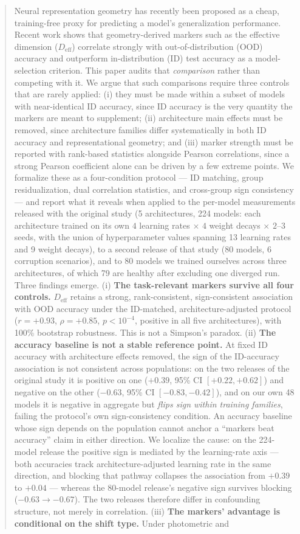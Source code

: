 \documentclass[10pt]{article} %
\begin{document}
\begin{abstract}
Neural representation geometry has recently been proposed as a cheap, training-free proxy for predicting a model's generalization performance. Recent work \citep{chou2026diagnosing} shows that geometry-derived markers such as the effective dimension ($D_{\mathrm{eff}}$) correlate strongly with out-of-distribution (OOD) accuracy and outperform in-distribution (ID) test accuracy as a model-selection criterion. This paper audits that \emph{comparison} rather than competing with it. We argue that such comparisons require three controls that are rarely applied: (i) they must be made within a subset of models with near-identical ID accuracy, since ID accuracy is the very quantity the markers are meant to supplement; (ii) architecture main effects must be removed, since architecture families differ systematically in both ID accuracy and representational geometry; and (iii) marker strength must be reported with rank-based statistics alongside Pearson correlations, since a strong Pearson coefficient alone can be driven by a few extreme points. We formalize these as a four-condition protocol --- ID matching, group residualization, dual correlation statistics, and cross-group sign consistency --- and report what it reveals when applied to the per-model measurements released with the original study (5 architectures, 224 models: each architecture trained on its own $4$ learning rates $\times$ $4$ weight decays $\times$ $2$--$3$ seeds, with the union of hyperparameter values spanning 13 learning rates and 9 weight decays), to a second release of that study (80 models, 6 corruption scenarios), and to 80 models we trained ourselves across three architectures, of which 79 are healthy after excluding one diverged run. Three findings emerge. (i) \textbf{The task-relevant markers survive all four controls.} $D_{\mathrm{eff}}$ retains a strong, rank-consistent, sign-consistent association with OOD accuracy under the ID-matched, architecture-adjusted protocol ($r = +0.93$, $\rho = +0.85$, $p < 10^{-4}$, positive in all five architectures), with 100\% bootstrap robustness. This is not a Simpson's paradox. (ii) \textbf{The accuracy baseline is not a stable reference point.} At fixed ID accuracy with architecture effects removed, the sign of the ID-accuracy association is not consistent across populations: on the two releases of the original study it is positive on one ($+0.39$, 95\% CI $[+0.22,+0.62]$) and negative on the other ($-0.63$, 95\% CI $[-0.83,-0.42]$), and on our own 48 models it is negative in aggregate but \emph{flips sign within training families}, failing the protocol's own sign-consistency condition. An accuracy baseline whose sign depends on the population cannot anchor a ``markers beat accuracy'' claim in either direction. We localize the cause: on the 224-model release the positive sign is mediated by the learning-rate axis --- both accuracies track architecture-adjusted learning rate in the same direction, and blocking that pathway collapses the association from $+0.39$ to $+0.04$ --- whereas the 80-model release's negative sign survives blocking ($-0.63 \rightarrow -0.67$). The two releases therefore differ in confounding structure, not merely in correlation. (iii) \textbf{The markers' advantage is conditional on the shift type.} Under photometric and 
\end{abstract}
\end{document}
